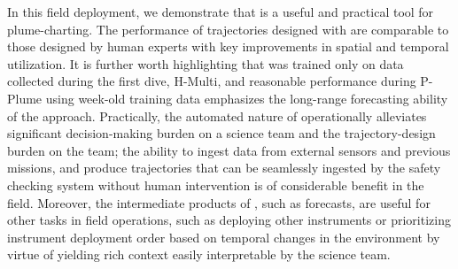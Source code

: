 In this field deployment, we demonstrate that \PHORTEX is a useful and practical tool for plume-charting. The performance of trajectories designed with \PHORTEX are comparable to those designed by human experts with key improvements in spatial and temporal utilization. It is further worth highlighting that \PHORTEX was trained only on data collected during the first dive, H-Multi, and reasonable performance during P-Plume using week-old training data emphasizes the long-range forecasting ability of the approach. Practically, the automated nature of \PHORTEX operationally alleviates significant decision-making burden on a science team and the trajectory-design burden on the \Sentry team; the ability to ingest data from external sensors and previous \Sentry missions, and produce trajectories that can be seamlessly ingested by the safety checking system without human intervention is of considerable benefit in the field. Moreover, the intermediate products of \PHORTEX, such as \PHUMES forecasts, are useful for other tasks in field operations, such as deploying other instruments or prioritizing instrument deployment order based on temporal changes in the environment by virtue of yielding rich context easily interpretable by the science team. 



